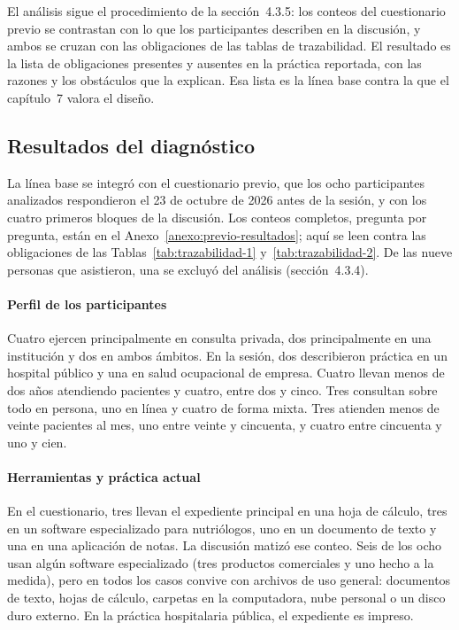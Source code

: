 \documentclass[12pt, a4paper]{article}
\begin{document}
El análisis sigue el procedimiento de la sección~4.3.5: los conteos del
cuestionario previo se contrastan con lo que los participantes describen en
la discusión, y ambos se cruzan con las obligaciones de las tablas de
trazabilidad. El resultado es la lista de obligaciones presentes y
ausentes en la práctica reportada, con las razones y los obstáculos
que la explican. Esa lista es la línea base contra la que el capítulo~7 valora el diseño.
 
\subsection{Resultados del diagnóstico}
 
La línea base se integró con el cuestionario previo, que los ocho
participantes analizados respondieron el 23 de octubre de 2026 antes de
la sesión, y con los cuatro primeros bloques de la discusión. Los
conteos completos, pregunta por pregunta, están en el
Anexo~\ref{anexo:previo-resultados}; aquí se leen contra las
obligaciones de las Tablas~\ref{tab:trazabilidad-1}
y~\ref{tab:trazabilidad-2}. De las nueve personas que asistieron, una
se excluyó del análisis (sección~4.3.4).
 
\paragraph{Perfil de los participantes}
Cuatro ejercen principalmente en consulta privada, dos principalmente
en una institución y dos en ambos ámbitos. En la sesión, dos describieron práctica en un hospital
público y una en salud ocupacional de empresa. Cuatro llevan menos de
dos años atendiendo pacientes y cuatro, entre dos y cinco. Tres
consultan sobre todo en persona, uno en línea y cuatro de forma mixta.
Tres atienden menos de veinte pacientes al mes, uno entre veinte y
cincuenta, y cuatro entre cincuenta y uno y cien.
 
\paragraph{Herramientas y práctica actual}
En el cuestionario, tres llevan el expediente principal en una hoja de
cálculo, tres en un software especializado para nutriólogos, uno en un
documento de texto y una en una aplicación de notas. La discusión matizó
ese conteo. Seis de los ocho usan algún software especializado (tres
productos comerciales y uno hecho a la medida), pero en todos los casos
convive con archivos de uso general: documentos de texto, hojas de
cálculo, carpetas en la computadora, nube personal o un disco duro
externo. En la práctica hospitalaria pública, el expediente es impreso.
\end{document}
